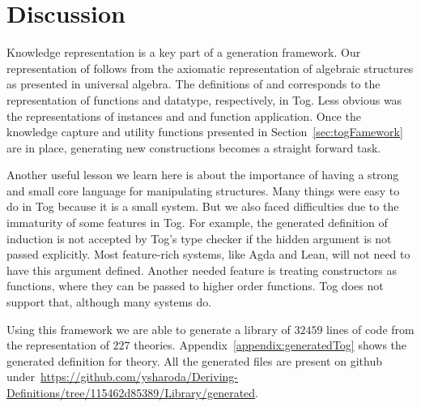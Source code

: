 \section{Discussion}
\label{sec:generation:discussion}
Knowledge representation is a key part of a generation framework. Our representation of  follows from the axiomatic representation of algebraic structures as presented in universal algebra. The definitions of  and  corresponds to the representation of functions and datatype, respectively, in Tog. Less obvious was the representations of instances  and  and function application. 
Once the knowledge capture and utility functions presented in Section~\ref{sec:togFamework} are in place, generating new constructions becomes a straight forward task. 

Another useful lesson we learn here is about the importance of having a strong and small core language for manipulating structures. Many things were easy to do in Tog because it is a small system. But we also faced difficulties due to the immaturity of some features in Tog.  
For example, the generated definition of induction is not accepted by Tog's type checker if the hidden argument  is not passed explicitly. Most feature-rich systems, like Agda and Lean, will not need to have this argument defined. Another needed feature is treating constructors as functions, where they can be passed to higher order functions. Tog does not support that, although many systems do.  

Using this framework we are able to generate a library of $32459$ lines of code from the representation of $227$ theories. Appendix~\ref{appendix:generatedTog} shows the generated definition for  theory. All the generated files are present on github under~\url{https://github.com/ysharoda/Deriving-Definitions/tree/115462d85389/Library/generated}. 
 

